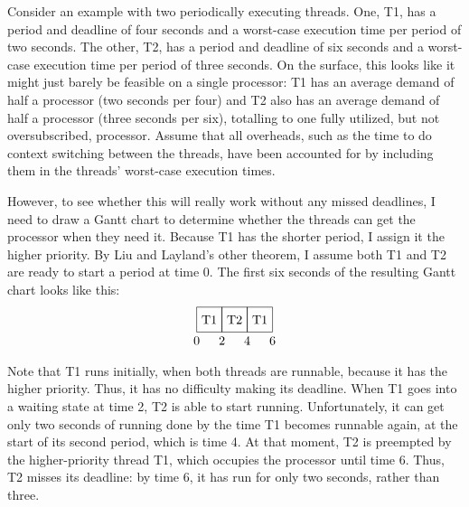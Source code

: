 Consider an example with two periodically executing threads.
One, T1, has a period and deadline of four seconds and a worst-case
execution time per period of two seconds.  The other, T2, has a period
and deadline of six seconds and a worst-case execution time per
period of three seconds.  On the surface, this looks like it might
just barely be feasible on a single processor: T1 has an average
demand of half a processor (two seconds per four) and T2 also has an
average demand of half a processor (three seconds per six), totalling
to one fully utilized, but not oversubscribed, processor.  Assume
that all overheads, such as the time to do context switching between
the threads, have been accounted for by including them in the threads'
worst-case execution times.

However, to see whether this will really work without any missed
deadlines, I need to draw a Gantt chart to determine whether the threads can get the processor when
they need it.  Because T1 has the shorter
period, I assign it the higher priority.  By Liu and Layland's other
theorem, I assume both T1 and T2 are ready to start a period at time
0.  The first six seconds of the resulting Gantt chart looks like this:
\[\begin{tikzpicture}[scale=.035]
\draw (0,0) rectangle (20,20);
\draw (20,0) rectangle (40,20);
\draw (40,0) rectangle (60,20);
\draw (10,10) node{T1};
\draw (30,10) node{T2};
\draw (50,10) node{T1};
\draw (0,-7) node{0};
\draw (20,-7) node{2};
\draw (40,-7) node{4};
\draw (60,-7) node{6};
\end{tikzpicture}\]
\iffalse
\[\begin{graph}(70,32)(-3,-12)
\graphlinecolour{0}
\fillednodesfalse
\rectnode{a}[20,20](10,10)
\rectnode{b}[20,20](30,10)
\rectnode{c}[20,20](50,10)
\autonodetext{a}{T1}
\autonodetext{b}{T2}
\autonodetext{c}{T1}
\freetext(0,-7){0}
\freetext(20,-7){2}
\freetext(40,-7){4}
\freetext(60,-7){6}
\end{graph}\]
\fi
\iffalse
\begin{verbatim}
+----+----+----+
| T1 | T2 | T1 |
+----+----+----+
0    2    4    6
\end{verbatim}
\fi
Note that T1 runs initially, when both threads are runnable, because
it has the higher priority.  Thus, it has no difficulty making its
deadline.  When T1 goes into a waiting state at time 2, T2 is able to
start running.  Unfortunately, it can get only two seconds of running
done by the time T1 becomes runnable again, at the start of its second
period, which is time 4.  At that moment, T2 is preempted by the
higher-priority thread T1, which occupies the processor until time 6.
Thus, T2 misses its deadline: by time 6, it has run for only two
seconds, rather than three.

